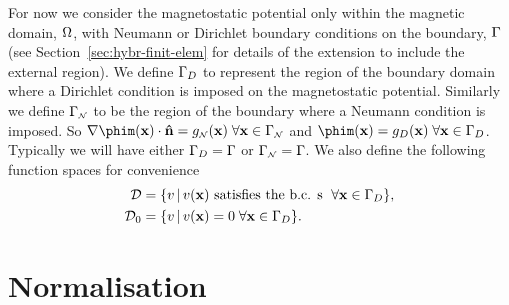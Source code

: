 For now we consider the magnetostatic potential only within the magnetic domain, $\Omega$, with Neumann or Dirichlet boundary conditions on the boundary, ${\Gamma}$ (see Section~\ref{sec:hybr-finit-elem} for details of the extension to include the external region). We define ${\Gamma}_D$ to represent the region of the boundary domain where a Dirichlet condition is imposed on the magnetostatic potential. Similarly we define ${\Gamma}_{\scriptscriptstyle{\mathcal{N}}}$ to be the region of the boundary where a Neumann condition is imposed. So $ \nabla \phim(\xv) \cdot \nv = g_\Neu(\xv) \; \forall \xv \in \boundd_\Neu$ and $\phim(\xv) = g_D(\xv) \; \forall \xv \in \boundd_D$. Typically we will have either ${\Gamma}_D = {\Gamma}$ or ${\Gamma}_{\scriptscriptstyle{\mathcal{N}}} = {\Gamma}$. We also define the following function spaces for convenience
\begin{align}
  \label{eq:037}
  \mathcal{D} & = \{ v \,|\, v(\mathbf{x}) \text{ satisfies the b.c. s } \; \forall \mathbf{x} \in {\Gamma}_D \}, \\
  \mathcal{D}_0 &= \{ v \,|\, v(\mathbf{x}) = 0 \; \forall \mathbf{x} \in {\Gamma}_D \}.
\end{align}

\section{Normalisation}
\label{sec:normalisation}



